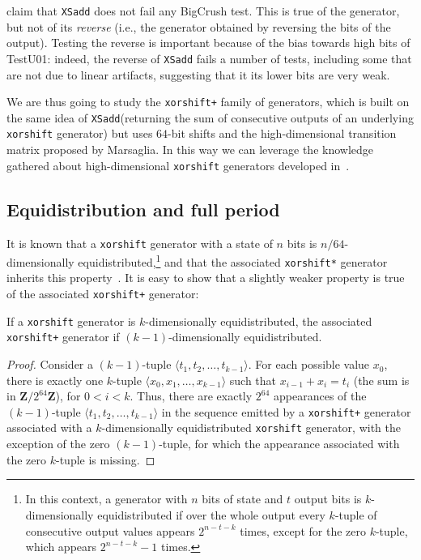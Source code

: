 \documentclass{acmsmalltr}
\newcommand{\Z}{\mathbf Z}
\newcommand{\xorshift}[1][]{\texttt{xorshift#1}\xspace}
\newcommand{\xorshifts}[1][]{\texttt{xorshift#1*}\xspace}
\newcommand{\xorshiftp}[1][]{\texttt{xorshift#1+}\xspace}
\newcommand{\xsadd}{\texttt{XSadd}\xspace}
\newcommand{\la}{\langle}
\newcommand{\ra}{\rangle}
\begin{document}
 claim that \xsadd does not fail
any BigCrush test. This is true of the generator, but not of its \emph{reverse}
(i.e., the generator obtained by reversing the bits of the output). Testing the reverse is important because
of the bias towards high bits of TestU01: indeed, the reverse of
\xsadd fails a number of tests, including some that are not due to linear
artifacts, suggesting that it its lower bits are very weak.

We are thus going to study the \xorshiftp family of
generators, which is built on the same idea of \xsadd (returning the sum of consecutive outputs of an
underlying \xorshift generator) but uses $64$-bit shifts and the
high-dimensional transition matrix proposed by Marsaglia. In this way we can leverage the knowledge gathered about
high-dimensional \xorshift generators developed in~\cite{VigEEMXGS}.
 
\subsection{Equidistribution and full period}
\label{sec:ed}

It is known that a \xorshift generator with a state of $n$ bits is
$n/64$-dimensionally equidistributed,\footnote{In this context, a generator with
$n$ bits of state and $t$ output bits is $k$-dimensionally equidistributed if
over the whole output every $k$-tuple of consecutive output values appears $2^{n-t-k}$ times, except
for the zero $k$-tuple, which appears $2^{n-t-k}-1$ times.} and that the
associated \xorshifts generator inherits this property~\cite{VigEEMXGS}. It is easy to show that a slightly weaker property is true of the associated \xorshiftp generator:

\begin{proposition}
\label{prop:eqdist}
If a \xorshift generator is $k$-dimensionally equidistributed, the associated
\xorshiftp generator if $(k-1)$-dimensionally equidistributed.
\end{proposition}
\begin{proof}
Consider a $(k-1)$-tuple $\la t_1,t_2,\ldots,t_{k-1}\ra$. For each possible
value $x_0$, there is exactly one $k$-tuple $\la x_0,x_1,\ldots,x_{k-1}\ra$
such that $x_{i-1}+x_i=t_i$ (the sum is in $\Z/2^{64}\Z$), for $0<i<k$. Thus,
there are exactly $2^{64}$ appearances of the $(k-1)$-tuple $\la
t_1,t_2,\ldots,t_{k-1}\ra$ in the sequence emitted by a \xorshiftp generator
associated with a $k$-dimensionally equidistributed \xorshift generator, with
the exception of the zero $(k-1)$-tuple, for which the appearance associated
with the zero $k$-tuple is missing.
\end{proof}
\end{document}
